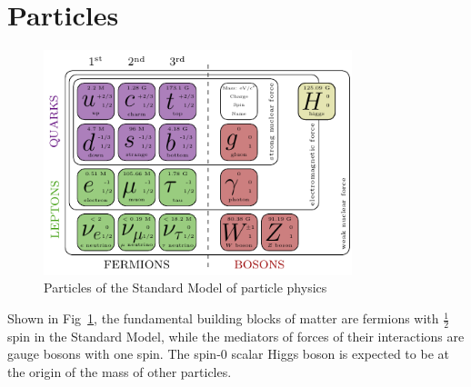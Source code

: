 \section{Particles}
\begin{figure}[htbp]
    \centering
    \includegraphics[width=0.8\textwidth]{chapters/c1/figures/SM-particle-table}
    \caption{Particles of the Standard Model of particle physics}
    \label{fig:c1Standard Modelparticletable}
\end{figure}
\par Shown in Fig~\ref{fig:c1Standard Modelparticletable}, the fundamental building blocks of matter are fermions with $\frac{1}{2}$ 
spin in the Standard Model, while the mediators of forces of their interactions are gauge bosons with one spin. 
The spin-0 scalar Higgs boson is expected to be at the origin of the mass of other particles.

